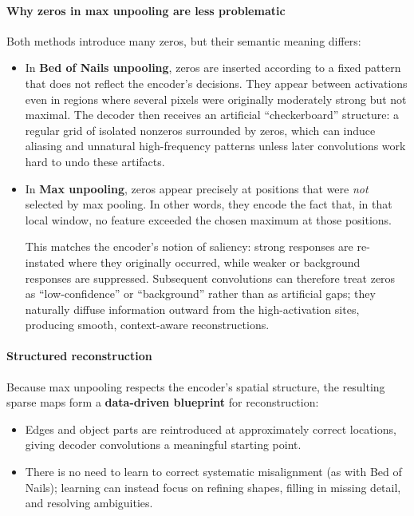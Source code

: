 \paragraph{Why zeros in max unpooling are less problematic}
\noindent
Both methods introduce many zeros, but their semantic meaning differs:
\begin{itemize}
	\item In \textbf{Bed of Nails unpooling}, zeros are inserted according to a fixed pattern that does not reflect the encoder’s decisions. They appear between activations even in regions where several pixels were originally moderately strong but not maximal. The decoder then receives an artificial ``checkerboard'' structure: a regular grid of isolated nonzeros surrounded by zeros, which can induce aliasing and unnatural high-frequency patterns unless later convolutions work hard to undo these artifacts.
	\item In \textbf{Max unpooling}, zeros appear precisely at positions that were \emph{not} selected by max pooling. In other words, they encode the fact that, in that local window, no feature exceeded the chosen maximum at those positions. 
	
	\newpage
	
	This matches the encoder’s notion of saliency: strong responses are re-instated where they originally occurred, while weaker or background responses are suppressed. Subsequent convolutions can therefore treat zeros as ``low-confidence'' or ``background'' rather than as artificial gaps; they naturally diffuse information outward from the high-activation sites, producing smooth, context-aware reconstructions.
\end{itemize}

\paragraph{Structured reconstruction}
\noindent
Because max unpooling respects the encoder’s spatial structure, the resulting sparse maps form a \textbf{data-driven blueprint} for reconstruction:
\begin{itemize}
	\item Edges and object parts are reintroduced at approximately correct locations, giving decoder convolutions a meaningful starting point.
	\item There is no need to learn to correct systematic misalignment (as with Bed of Nails); learning can instead focus on refining shapes, filling in missing detail, and resolving ambiguities.
\end{itemize}

